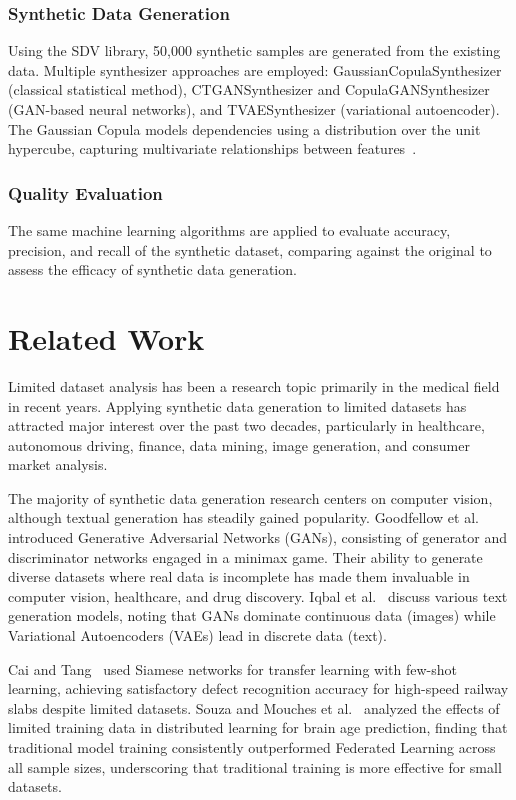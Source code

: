 \documentclass[conference]{IEEEtran}
\begin{document}
\subsubsection{Synthetic Data Generation}
Using the SDV library, 50,000 synthetic samples are generated from the existing data. Multiple synthesizer approaches are employed: GaussianCopulaSynthesizer (classical statistical method), CTGANSynthesizer and CopulaGANSynthesizer (GAN-based neural networks), and TVAESynthesizer (variational autoencoder). The Gaussian Copula models dependencies using a distribution over the unit hypercube, capturing multivariate relationships between features~\cite{copula}.

\subsubsection{Quality Evaluation}
The same machine learning algorithms are applied to evaluate accuracy, precision, and recall of the synthetic dataset, comparing against the original to assess the efficacy of synthetic data generation.

\section{Related Work}
Limited dataset analysis has been a research topic primarily in the medical field in recent years. Applying synthetic data generation to limited datasets has attracted major interest over the past two decades, particularly in healthcare, autonomous driving, finance, data mining, image generation, and consumer market analysis.

The majority of synthetic data generation research centers on computer vision, although textual generation has steadily gained popularity. Goodfellow et al.~\cite{goodfellow} introduced Generative Adversarial Networks (GANs), consisting of generator and discriminator networks engaged in a minimax game. Their ability to generate diverse datasets where real data is incomplete has made them invaluable in computer vision, healthcare, and drug discovery. Iqbal et al.~\cite{iqbal} discuss various text generation models, noting that GANs dominate continuous data (images) while Variational Autoencoders (VAEs) lead in discrete data (text).

Cai and Tang~\cite{cai} used Siamese networks for transfer learning with few-shot learning, achieving satisfactory defect recognition accuracy for high-speed railway slabs despite limited datasets. Souza and Mouches et al.~\cite{souza} analyzed the effects of limited training data in distributed learning for brain age prediction, finding that traditional model training consistently outperformed Federated Learning across all sample sizes, underscoring that traditional training is more effective for small datasets.
\end{document}
